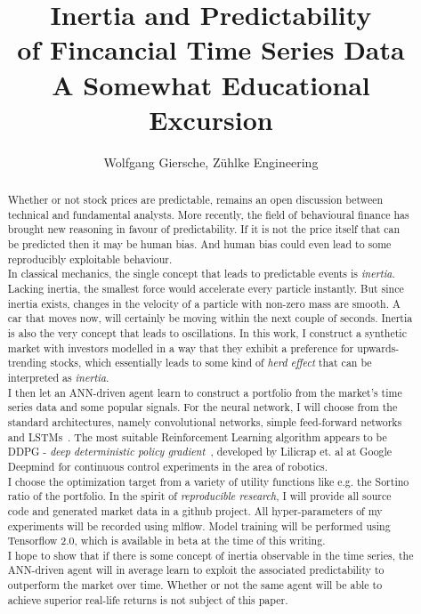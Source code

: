 \documentclass{article}
\title{%
	Inertia and Predictability \\
	of Fincancial Time Series Data\\
	\vskip 0.1in
	\large A Somewhat Educational Excursion
	\vskip 0.2in
}
\author{Wolfgang Giersche, Zühlke Engineering}
\begin{document}
	\maketitle
	\newpage

	\begin{abstract}
		Whether or not stock prices are predictable, remains an open discussion between technical and fundamental analysts. More recently, the field of behavioural finance has brought new reasoning in favour of predictability.
		If it is not the price itself that can be predicted then it may be human bias. And human bias could even lead to some reproducibly exploitable behaviour. \\
		In classical mechanics, the single concept that leads to predictable events is \emph{inertia}. Lacking inertia, the smallest force would accelerate every particle instantly. But since inertia exists, changes in the velocity of a particle with non-zero mass are smooth. A car that moves now, will certainly be moving within the next couple of seconds. Inertia is also the very concept that leads to oscillations. In this work, I construct a synthetic market with investors modelled in a way that they exhibit a preference for upwards-trending stocks, which essentially leads to some kind of \emph{herd effect} that can be interpreted as \emph{inertia}. 
		\\
		I then let an ANN-driven agent learn to construct a portfolio from the market's time series data and some popular signals. For the neural network, I will choose from the standard architectures, namely convolutional networks, simple feed-forward networks and LSTMs~\cite{LSTM97}. The most suitable Reinforcement Learning algorithm appears to be DDPG - \emph{deep deterministic policy gradient}~\cite{Lillicrap2015}, developed by Lilicrap et. al at Google Deepmind for continuous control experiments in the area of robotics. 
		\\
		I choose the optimization target from a variety of utility functions like e.g. the Sortino ratio of the portfolio. In the spirit of \emph{reproducible research}, I will provide all source code and generated market data in a github project. All hyper-parameters of my experiments will be recorded using mlflow. Model training will be performed using Tensorflow 2.0, which is available in beta at the time of this writing. \\
		I hope to show that if there is some concept of inertia observable in the time series, the ANN-driven agent will in average learn to exploit the associated predictability to outperform the market over time. Whether or not the same agent will be able to achieve superior real-life returns is not subject of this paper.
	\end{abstract}
\end{document}
